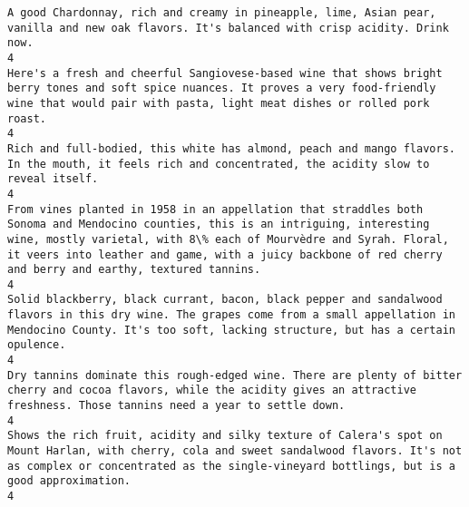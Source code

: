 \documentclass[11pt]{article}
\begin{document}
\begin{Verbatim}[commandchars=\\\{\}]
A good Chardonnay, rich and creamy in pineapple, lime, Asian pear, vanilla and new oak flavors. It's balanced with crisp acidity. Drink now.                                                                                                                                                                                                                                                                   4
Here's a fresh and cheerful Sangiovese-based wine that shows bright berry tones and soft spice nuances. It proves a very food-friendly wine that would pair with pasta, light meat dishes or rolled pork roast.                                                                                                                                                                                                4
Rich and full-bodied, this white has almond, peach and mango flavors. In the mouth, it feels rich and concentrated, the acidity slow to reveal itself.                                                                                                                                                                                                                                                         4
From vines planted in 1958 in an appellation that straddles both Sonoma and Mendocino counties, this is an intriguing, interesting wine, mostly varietal, with 8\% each of Mourvèdre and Syrah. Floral, it veers into leather and game, with a juicy backbone of red cherry and berry and earthy, textured tannins.                                                                                             4
Solid blackberry, black currant, bacon, black pepper and sandalwood flavors in this dry wine. The grapes come from a small appellation in Mendocino County. It's too soft, lacking structure, but has a certain opulence.                                                                                                                                                                                      4
Dry tannins dominate this rough-edged wine. There are plenty of bitter cherry and cocoa flavors, while the acidity gives an attractive freshness. Those tannins need a year to settle down.                                                                                                                                                                                                                    4
Shows the rich fruit, acidity and silky texture of Calera's spot on Mount Harlan, with cherry, cola and sweet sandalwood flavors. It's not as complex or concentrated as the single-vineyard bottlings, but is a good approximation.                                                                                                                                                                           4

\end{Verbatim}
\end{document}
